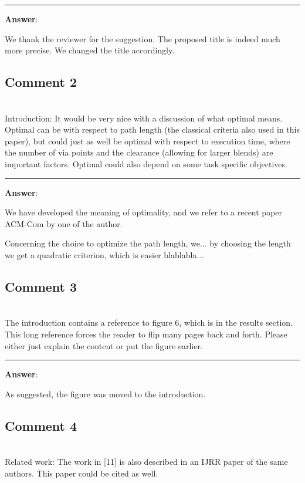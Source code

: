 \documentclass{scrartcl}
\begin{document}
\rule{\linewidth}{.1pt}
\textbf{Answer}:

We thank the reviewer for the suggestion. The proposed title is indeed much more precise. We changed the title accordingly.

\subsection{Comment 2}
\hrulefill\\

Introduction: 
It would be very nice with a discussion of what optimal means. Optimal can be with respect to path length (the classical criteria also used in this paper), but could just as well be optimal with respect to execution time, where the number of via points and the clearance (allowing for larger blends) are important factors. Optimal could also depend on some task specific objectives. 

\rule{\linewidth}{.1pt}
\textbf{Answer}:

We have developed the meaning of optimality, and we refer to a recent paper ACM-Com by one of the author.

Concerning the choice to optimize the path length, we... by choosing the length we get a quadratic criterion, which is easier blablabla...

\subsection{Comment 3}
\hrulefill\\

The introduction contains a reference to figure 6, which is in the results section. This long reference forces the reader to flip many pages back and forth. Please either just explain the content or put the figure earlier.

\rule{\linewidth}{.1pt}
\textbf{Answer}:

As suggested, the figure was moved to the introduction.

\subsection{Comment 4}
\hrulefill\\

Related work: 
The work in [11] is also described in an IJRR paper of the same authors. This paper could be cited as well.
\end{document}
